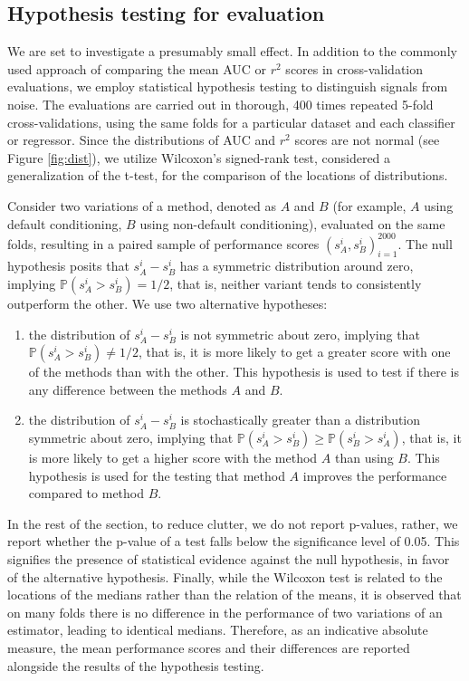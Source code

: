 \documentclass[sn-mathphys]{sn-jnl}%
\theoremstyle{thmstyleone}%
\theoremstyle{thmstyletwo}%
\theoremstyle{thmstylethree}%
\begin{document}
\subsection{Hypothesis testing for evaluation}
\label{sec:tests-testing}

We are set to investigate a presumably small effect. In addition to the commonly used approach of comparing the mean AUC or $r^2$ scores in cross-validation evaluations, we employ statistical hypothesis testing to distinguish signals from noise. The evaluations are carried out in thorough, 400 times repeated 5-fold cross-validations, using the same folds for a particular dataset and each classifier or regressor. Since the distributions of AUC and $r^2$ scores are not normal (see Figure \ref{fig:dist}), we utilize Wilcoxon's signed-rank test, considered a generalization of the t-test, for the comparison of the locations of distributions.

Consider two variations of a method, denoted as $A$ and $B$ (for example, $A$ using default conditioning, $B$ using non-default conditioning), evaluated on the same folds, resulting in a paired sample of performance scores $(s^{i}_A, s^{i}_B)_{i=1}^{2000}$. The null hypothesis posits that $s^i_A - s^i_B$ has a symmetric distribution around zero, implying $\mathbb{P}(s^i_A > s^i_B) = 1/2$, that is, neither variant tends to consistently outperform the other. We use two alternative hypotheses:
\begin{enumerate}
  \item the distribution of $s^i_A - s^i_B$ is not symmetric about zero, implying that $\mathbb{P}(s^i_A > s^i_B) \neq 1/2$, that is, it is more likely to get a greater score with one of the methods than with the other. This hypothesis is used to test if there is any difference between the methods $A$ and $B$.
  \item the distribution of $s^i_A - s^i_B$ is stochastically greater than a distribution symmetric about zero, implying that $\mathbb{P}(s^i_A > s^i_B) \geq \mathbb{P}(s^i_B > s^i_A)$, that is, it is more likely to get a higher score with the method $A$ than using $B$. This hypothesis is used for the testing that method $A$ improves the performance compared to method $B$.
\end{enumerate}
In the rest of the section, to reduce clutter, we do not report p-values, rather, we report whether the p-value of a test falls below the significance level of 0.05. This signifies the presence of statistical evidence against the null hypothesis, in favor of the alternative hypothesis. Finally, while the Wilcoxon test is related to the locations of the medians rather than the relation of the means, it is observed that on many folds there is no difference in the performance of two variations of an estimator, leading to identical medians. Therefore, as an indicative absolute measure, the mean performance scores and their differences are reported alongside the results of the hypothesis testing.
\end{document}
